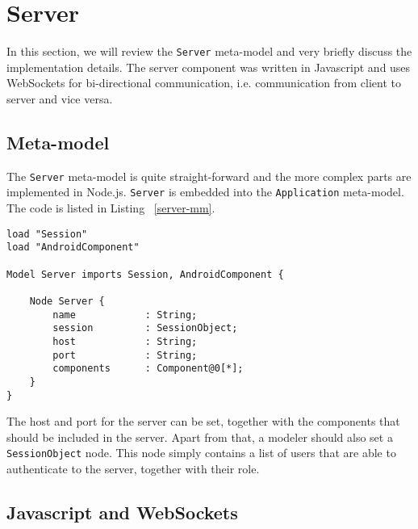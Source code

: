 \section{Server}

In this section, we will review the \texttt{Server} meta-model and very briefly discuss the implementation details. The server component was written in Javascript and uses WebSockets for bi-directional communication, i.e. communication from client to server and vice versa.

\subsection{Meta-model}

The \texttt{Server} meta-model is quite straight-forward and the more complex parts are implemented in Node.js. \texttt{Server} is embedded into the \texttt{Application} meta-model. The code is listed in Listing ~\ref{server-mm}.

\begin{lstlisting}[label=server-mm,caption=Server meta-model, captionpos=t]
load "Session"
load "AndroidComponent"

Model Server imports Session, AndroidComponent {

	Node Server {
		name 			: String;
		session 		: SessionObject;
		host 			: String;
		port 			: String;
		components 		: Component@0[*];
	}
}
\end{lstlisting}
The host and port for the server can be set, together with the components that should be included in the server. Apart from that, a modeler should also set a \texttt{SessionObject} node. This node simply contains a list of users that are able to authenticate to the server, together with their role. 

\subsection{Javascript and WebSockets}

